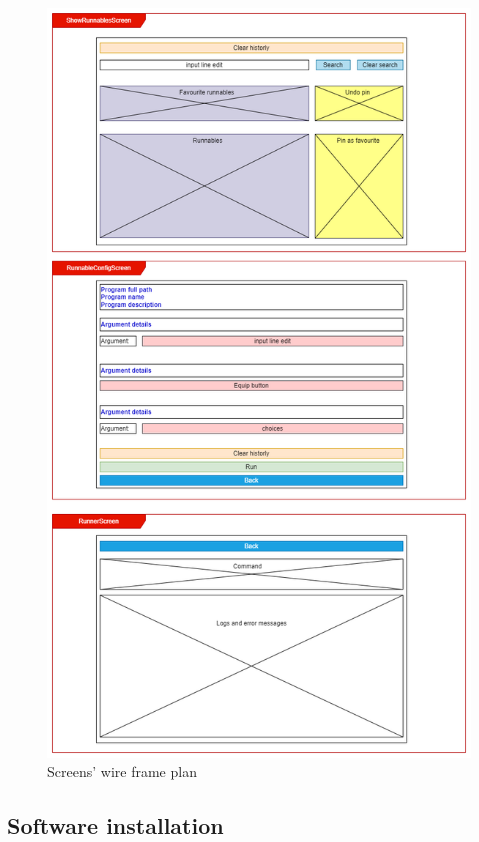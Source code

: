 \documentclass{article}
\begin{document}
\begin{figure}[h]
    \centering
    \includegraphics[width=1\linewidth]{img/wire_frame_plan.drawio.png}
    \caption{Screens' wire frame plan}
    \label{fig:enter-label}
\end{figure}

\newpage

\subsection{Software installation}
\end{document}
